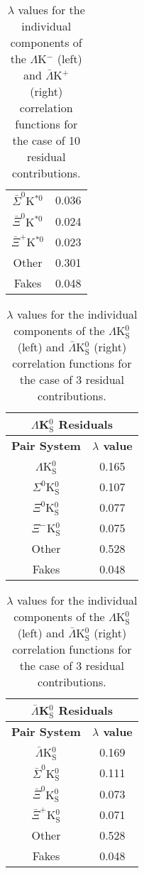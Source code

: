 \documentclass[ALICE,manyauthors]{cernphprep}
\begin{document}
\begin{table}[htbp]
\begin{minipage}{0.3\textwidth}
\begin{tabular}{|c|c|}
   $\bar{\Sigma}^{0}$K$^{*0}$ & 0.036 \\
   $\bar{\Xi}^{0}$K$^{*0}$ & 0.024 \\
   $\bar{\Xi}^{+}$K$^{*0}$ & 0.023 \\
   Other & 0.301 \\
   Fakes & 0.048 \\
   \hline
  \end{tabular}
 \end{minipage} 
 \caption{$\lambda$ values for the individual components of the $\Lambda$K$^{-}$ (left) and $\bar{\Lambda}$K$^{+}$ (right) correlation functions for the case of 10 residual contributions.}
 \label{tab:LambdaValues_10Res_LamKchM}
\end{table}


\clearpage
\begin{table}[htbp]
 \centering
 \begin{minipage}{0.3\textwidth}
  \centering
  \begin{tabular}{|c|c|}
   \multicolumn{2}{c}{$\Lambda$K$^{0}_{\mathrm{S}}$ Residuals} \\
   \hline
   \textbf{Pair System} & \textbf{$\lambda$ value} \\
   \hline
   $\Lambda$K$^{0}_{\mathrm{S}}$ & 0.165 \\
   $\Sigma^{0}$K$^{0}_{\mathrm{S}}$ & 0.107 \\
   $\Xi^{0}$K$^{0}_{\mathrm{S}}$ & 0.077 \\
   $\Xi^{-}$K$^{0}_{\mathrm{S}}$ & 0.075 \\
   Other & 0.528 \\
   Fakes & 0.048 \\
   \hline
  \end{tabular}
 \end{minipage}
 \begin{minipage}{0.3\textwidth}
  \centering
  \begin{tabular}{|c|c|}
   \multicolumn{2}{c}{$\bar{\Lambda}$K$^{0}_{\mathrm{S}}$ Residuals} \\
   \hline
   \textbf{Pair System} & \textbf{$\lambda$ value} \\
   \hline
   $\bar{\Lambda}$K$^{0}_{\mathrm{S}}$ & 0.169 \\
   $\bar{\Sigma}^{0}$K$^{0}_{\mathrm{S}}$ & 0.111 \\
   $\bar{\Xi}^{0}$K$^{0}_{\mathrm{S}}$ & 0.073 \\
   $\bar{\Xi}^{+}$K$^{0}_{\mathrm{S}}$ & 0.071 \\
   Other & 0.528 \\
   Fakes & 0.048 \\
   \hline
  \end{tabular}
 \end{minipage} 
 \caption{$\lambda$ values for the individual components of the $\Lambda$K$^{0}_{\mathrm{S}}$ (left) and $\bar{\Lambda}$K$^{0}_{\mathrm{S}}$ (right) correlation functions for the case of 3 residual contributions.}
 \label{tab:LambdaValues_3Res_LamK0}
\end{table}
\end{document}
